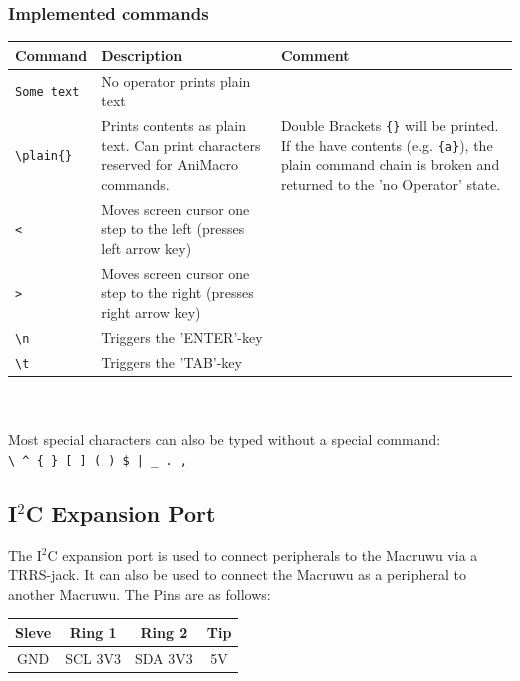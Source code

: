 \documentclass[english, 12pt]{scrartcl}
\begin{document}
	\subsubsection{Implemented commands}
	\begin{tabular}{|l|m{6.5cm}|m{6.5cm}}
		\hline
		\textbf{Command} & \textbf{Description} & \textbf{Comment}\\
		\hline
		\hline
		\verb=Some text= & No operator prints plain text& \\
		\hline
		\verb=\plain{}= & Prints contents as plain text. Can print characters reserved for AniMacro commands. & Double Brackets \verb={}= will be printed. If the have contents (e.g. \verb={a}=), the plain command chain is broken and returned to the 'no Operator' state.\\
		\hline 
		\verb=<= & Moves screen cursor one step to the left (presses left arrow key) & \\
		\verb=>= & Moves screen cursor one step to the right (presses right arrow key) & \\
		\verb=\n= & Triggers the 'ENTER'-key & \\
		\verb=\t= & Triggers the 'TAB'-key & \\
		\hline
	\end{tabular}\\\\
	Most special characters can also be typed without a special command:\\
	\verb=\ ^ { } [ ] ( ) $ | _ . ,=
	
	\subsection{I$^2$C Expansion Port}
	\noindent
	The I$^2$C expansion port is used to connect peripherals to the Macruwu via a TRRS-jack. It can also be used to connect the Macruwu as a peripheral to another Macruwu. The Pins are as follows:
	\begin{center}
		\begin{tabular}{|c|c|c|c|}
			\hline
			Sleve&Ring 1& Ring 2& Tip\\
			\hline
			GND & SCL 3V3 & SDA 3V3 & 5V\\
			\hline
		\end{tabular}
	\end{center}
	
	
	
\end{document}
